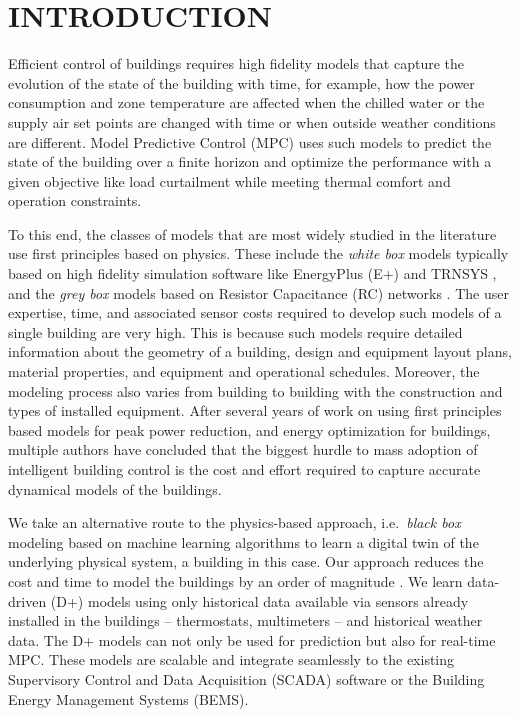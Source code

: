 \section{INTRODUCTION}
\label{S:intro}

Efficient control of buildings requires high fidelity models that capture the evolution of the state of the building with time, for example, how the power consumption and zone temperature are affected when the chilled water or the supply air set points are changed with time or when outside weather conditions are different.
Model Predictive Control (MPC) uses such models to predict the state of the building over a finite horizon and optimize the performance with a given objective like load curtailment while meeting thermal comfort and operation constraints.

To this end, the classes of models that are most widely studied in the literature use first principles based on physics. 
These include the \textit{white box} models typically based on high fidelity simulation software like EnergyPlus (E+) \cite{Deru2011} and TRNSYS \cite{Transys1975}, and the \textit{grey box} models based on Resistor Capacitance (RC) networks \cite{Deng2010}.
The user expertise, time, and associated sensor costs required to develop such models of a single building are very high.
This is because such models require detailed information about the geometry of a building, design and equipment layout plans, material properties, and equipment and operational schedules. 
Moreover, the modeling process also varies from building to building with the construction and types of installed equipment. 
After several years of work on using first principles based models for peak power reduction, and energy optimization for buildings, multiple authors \cite{Sturzenegger2016,vzavcekova2014} have concluded that the biggest hurdle to mass adoption of intelligent building control is the cost and effort required to capture accurate dynamical models of the buildings.

We take an alternative route to the physics-based approach, i.e.~\textit{black box} modeling based on machine learning algorithms to learn a digital twin of the underlying physical system, a building in this case.
Our approach reduces the cost and time to model the buildings by an order of magnitude \cite{JainICCPS2018,JainCDC2017,JainACC2017,nghiemetal16gp,behletal15dradvisor}.
We learn data-driven (D+) models using only historical data available via sensors already installed in the buildings -- thermostats, multimeters -- and historical weather data.
The D+ models can not only be used for prediction but also for real-time MPC.
These models are scalable and integrate seamlessly to the existing Supervisory Control and Data Acquisition (SCADA) software or the Building Energy Management Systems (BEMS).

